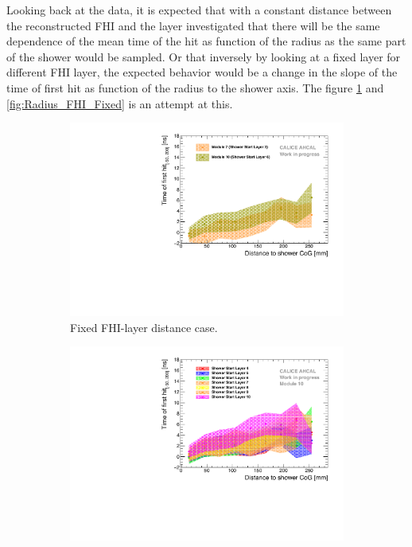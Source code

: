 Looking back at the data, it is expected that with a constant distance between the reconstructed FHI and the layer investigated that there will be the same dependence of the mean time of the hit as function of the radius as the same part of the shower would be sampled. Or that inversely by looking at a fixed layer for different FHI layer, the expected behavior would be a change in the slope of the time of first hit as function of the radius to the shower axis. The figure \ref{fig:Radius_FHI} and \ref{fig:Radius_FHI_Fixed} is an attempt at this.

\begin{figure}[htbp!]
	\begin{subfigure}[t]{0.5\textwidth}
		\centering
		\includegraphics[width=1\textwidth]{chap5/fig_AHCAL_timing/Pions/Timing_Radius_Comparison_ShortAsymRange_ShowerStart.pdf}
		\caption{Fixed FHI-layer distance case.}\label{fig:Radius_FHI}
	\end{subfigure}
	\hfill
	\begin{subfigure}[t]{0.5\textwidth}
		\centering
		\includegraphics[width=1\textwidth]{chap5/fig_AHCAL_timing/Pions/Timing_Radius_Comparison_ShortAsymRange_ShowerStart_FixedModule.pdf}

\end{subfigure}
\end{figure}
